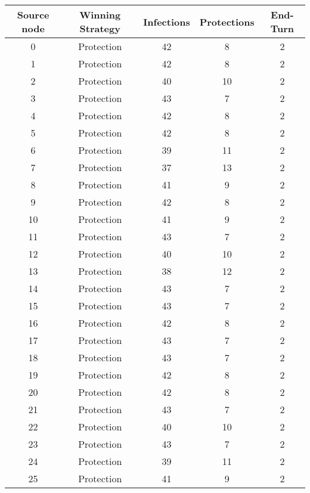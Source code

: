 \documentclass[results.tex]{subfiles}
\begin{document}
\begin{center}
  \begin{tabular}{| c || c | c | c | c |}
    \hline
    {\bfseries Source node} & {\bfseries Winning Strategy} & {\bfseries Infections} & {\bfseries Protections} & {\bfseries End-Turn} \\  %
    \hline\hline
    0 & Protection & 42 & 8 & 2 \\ 
    \hline
    1 & Protection & 42 & 8 & 2 \\ 
    \hline
    2 & Protection & 40 & 10 & 2 \\ 
    \hline
    3 & Protection & 43 & 7 & 2 \\ 
    \hline
    4 & Protection & 42 & 8 & 2 \\ 
    \hline
    5 & Protection & 42 & 8 & 2 \\ 
    \hline
    6 & Protection & 39 & 11 & 2 \\ 
    \hline
    7 & Protection & 37 & 13 & 2 \\ 
    \hline
    8 & Protection & 41 & 9 & 2 \\ 
    \hline
    9 & Protection & 42 & 8 & 2 \\ 
    \hline
    10 & Protection & 41 & 9 & 2 \\ 
    \hline
    11 & Protection & 43 & 7 & 2 \\ 
    \hline
    12 & Protection & 40 & 10 & 2 \\ 
    \hline
    13 & Protection & 38 & 12 & 2 \\ 
    \hline
    14 & Protection & 43 & 7 & 2 \\ 
    \hline
    15 & Protection & 43 & 7 & 2 \\ 
    \hline
    16 & Protection & 42 & 8 & 2 \\ 
    \hline
    17 & Protection & 43 & 7 & 2 \\ 
    \hline
    18 & Protection & 43 & 7 & 2 \\ 
    \hline
    19 & Protection & 42 & 8 & 2 \\ 
    \hline
    20 & Protection & 42 & 8 & 2 \\ 
    \hline
    21 & Protection & 43 & 7 & 2 \\ 
    \hline
    22 & Protection & 40 & 10 & 2 \\ 
    \hline
    23 & Protection & 43 & 7 & 2 \\ 
    \hline
    24 & Protection & 39 & 11 & 2 \\ 
    \hline
    25 & Protection & 41 & 9 & 2 \\ 

\end{tabular}
\end{center}
\end{document}
